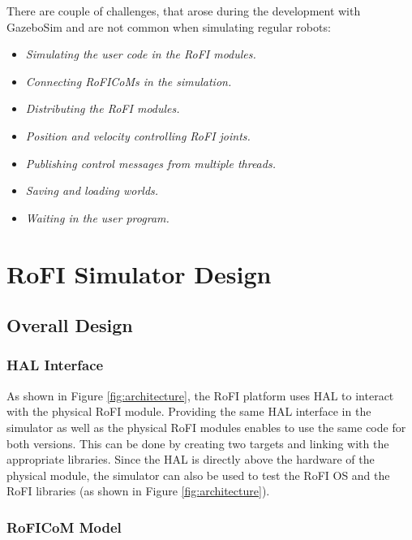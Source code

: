 \documentclass[
  digital, %
  table,   %
  oneside, %
  nolof,     %
  nolot,     %
]{fithesis3}
\begin{document}
There are couple of challenges, that arose during the development with GazeboSim and are not common when simulating regular robots:
\begin{itemize}
    \item \emph{Simulating the user code in the RoFI modules.}
    \item \emph{Connecting RoFICoMs in the simulation.}
    \item \emph{Distributing the RoFI modules.}
    \item \emph{Position and velocity controlling RoFI joints.}
    \item \emph{Publishing control messages from multiple threads.}
    \item \emph{Saving and loading worlds.}
    \item \emph{Waiting in the user program.}
\end{itemize}


\chapter{RoFI Simulator Design}

\section{Overall Design}



\subsection{HAL Interface}

As shown in Figure \ref{fig:architecture}, the RoFI platform uses HAL to interact with the physical RoFI module.
Providing the same HAL interface in the simulator as well as the physical RoFI modules enables to use the same code for both versions.
This can be done by creating two targets and linking with the appropriate libraries.
Since the HAL is directly above the hardware of the physical module, the simulator can also be used to test the RoFI OS and the RoFI libraries (as shown in Figure \ref{fig:architecture}).

\subsection{RoFICoM Model}
\end{document}

